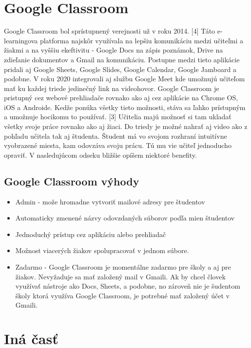 \documentclass[10pt,twoside,slovak,a4paper]{article}
\begin{document}
\section{Google Classroom} \label{Google Classroom}

Google Classroom bol sprístupnený verejnosti už v roku 2014. [4] Táto e-learningova platforma najskôr využívala na lepšiu komunikáciu medzi učiteľmi a žiakmi a na vyššiu ekeftivitu - Google Docs na zápis poznámok, Drive na zdieľanie dokumentov a Gmail na komunikáciu. Postupne medzi tieto aplikácie pridali aj Google Sheets, Google Slides, Google Calendar, Google Jamboard a podobne. V roku 2020 integrovali aj službu Google Meet kde umožnujú učiteľom mať ku každej triede jedinečný link na videohovor. Google Classroom je pristupný cez webové prehliadače rovnako ako aj cez aplikácie na Chrome OS, iOS a Androide. Kedže ponúka všetky tieto možnosti, stáva sa ľahko prístupným a umožnuje hocikomu to používať. [3] Učitelia majú možnosť si tam ukladať všetky svoje práce rovnako ako aj žiaci. Do triedy je možné nahrať aj video ako z pohľadu učitela tak aj študenta. Študent má vo svojom rozhraní intuitívne vyobrazené miesta, kam odovzáva svoju prácu. Tú mu vie učiteľ jednoducho opraviť. V nasledujúcom odseku bližšie opíšem niektoré benefity.

\subsection{Google Classroom výhody} \label{Google Classroom: Google Classroom výhody}

\begin{itemize}
	\item Admin - može hromadne vytvoriť mailové adresy pre študentov
	\item Automaticky zmenené názvy odovzdaných súborov podľa mien študentov
	\item Jednoduchý prístup cez aplikáciu alebo prehliadač
	\item Možnost viacerých žiakov spolupracovať v jednom súbore.
	\item Zadarmo -
Google Classroom je momentálne zadarmo pre školy a aj pre žiakov. Nevyžaduje sa mať založený mail v Gmaili. Ak by chcel človek využívať nástroje ako Docs, Sheets, a podobne, no zároveň nie je šudentom školy ktorá využíva Google Classroom, je potrebné mať založený účet v Gmaili. 
	\end{itemize}




\section{Iná časť} \label{ina}
\end{document}

